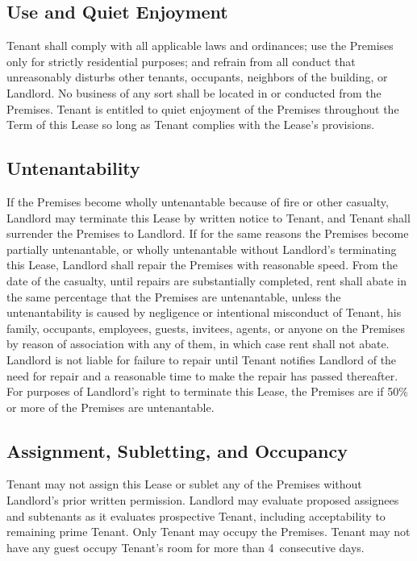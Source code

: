 \documentclass{article}
\begin{document}
\subsection{Use and Quiet Enjoyment}
Tenant shall comply with all applicable laws and ordinances; use the Premises
only for strictly residential purposes; and refrain from all conduct that
unreasonably disturbs other tenants, occupants, neighbors of the building, or
Landlord. No business of any sort shall be located in or conducted from the
Premises. Tenant is entitled to quiet enjoyment of the Premises throughout the
Term of this Lease so long as Tenant complies with the Lease’s provisions.

\subsection{Untenantability}
If the Premises become wholly untenantable because of fire or other casualty,
Landlord may terminate this Lease by written notice to Tenant, and Tenant shall
surrender the Premises to Landlord. If for the same reasons the Premises become
partially untenantable, or wholly untenantable without Landlord’s terminating
this Lease, Landlord shall repair the Premises with reasonable speed. From the
date of the casualty, until repairs are substantially completed, rent shall
abate in the same percentage that the Premises are untenantable, unless the
untenantability is caused by negligence or intentional misconduct of Tenant, his
family, occupants, employees, guests, invitees, agents, or anyone on the Premises
by reason of association with any of them, in which case rent shall not abate.
Landlord is not liable for failure to repair until Tenant notifies Landlord of
the need for repair and a reasonable time to make the repair has passed
thereafter. For purposes of Landlord’s right to terminate this Lease, the
Premises are  if 50\% or more of the
Premises are untenantable.

\subsection{Assignment, Subletting, and Occupancy}
Tenant may not assign this Lease or sublet any of the Premises without
Landlord’s prior written permission.
%
Landlord may evaluate
proposed assignees and subtenants as it evaluates prospective Tenant, including
acceptability to remaining prime Tenant. Only Tenant may occupy the Premises.
Tenant may not have any guest occupy Tenant’s room for more than 4~consecutive
days.
\end{document}
